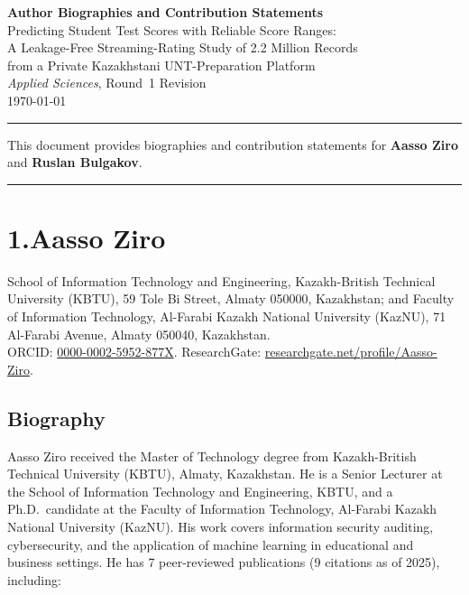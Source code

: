 \documentclass[11pt]{article}
\begin{document}
\begin{center}
{\LARGE\bfseries Author Biographies and Contribution Statements}\\[6pt]
{\large Predicting Student Test Scores with Reliable Score Ranges:\\
A Leakage-Free Streaming-Rating Study of 2.2 Million Records\\
from a Private Kazakhstani UNT-Preparation Platform}\\[4pt]
\textit{Applied Sciences}, Round~1 Revision\\[6pt]
\today
\end{center}

\hrule
\bigskip

This document provides biographies and contribution statements for
\textbf{Aasso Ziro} and \textbf{Ruslan Bulgakov}.

\bigskip\hrule\bigskip

\section*{1.\quad Aasso Ziro}

\noindent
School of Information Technology and Engineering,
Kazakh-British Technical University (KBTU), 59 Tole Bi Street, Almaty 050000,
Kazakhstan; and Faculty of Information Technology,
Al-Farabi Kazakh National University (KazNU),
71 Al-Farabi Avenue, Almaty 050040, Kazakhstan.\\
ORCID: \href{https://orcid.org/0000-0002-5952-877X}{0000-0002-5952-877X}.\quad
ResearchGate: \href{https://www.researchgate.net/profile/Aasso-Ziro}{researchgate.net/profile/Aasso-Ziro}.

\subsection*{Biography}

Aasso Ziro received the Master of Technology degree from Kazakh-British Technical
University (KBTU), Almaty, Kazakhstan.
He is a Senior Lecturer at the School of Information Technology and Engineering, KBTU,
and a Ph.D.\ candidate at the Faculty of Information Technology,
Al-Farabi Kazakh National University (KazNU).
His work covers information security auditing, cybersecurity, and the application of
machine learning in educational and business settings.
He has 7 peer-reviewed publications (9 citations as of 2025), including:
\end{document}
